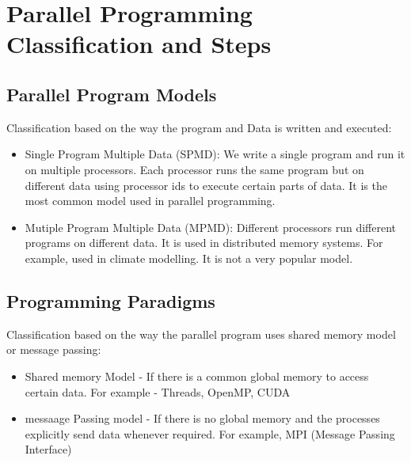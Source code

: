 \documentclass[12pt]{article}
\begin{document}
\newpage

\section{Parallel Programming Classification and Steps}
\subsection{Parallel Program Models}
Classification based on the way the program and Data is written and executed:
\begin{itemize}
    \item Single Program Multiple Data (SPMD): We write a single program and run it on multiple processors. Each processor runs the same program but on different data using processor ids to execute certain parts of data. It is the most common model used in parallel programming.
    \item Mutiple Program Multiple Data (MPMD): Different processors run different programs on different data. It is used in distributed memory systems. For example, used in climate modelling. It is not a very popular model. 
\end{itemize}
\subsection{Programming Paradigms}
Classification based on the way the parallel program uses shared memory model or message passing:
\begin{itemize}
    \item Shared memory Model - If there is a common global memory to access certain data. For example - Threads, OpenMP, CUDA
    \item messaage Passing model - If there is no global memory and the processes explicitly send data whenever required. For example, MPI (Message Passing Interface)
\end{itemize}
\end{document}
